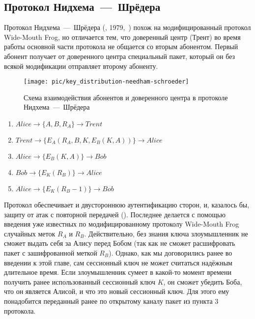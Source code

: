 \subsection{Протокол Нидхема~---~Шрёдера}\label{section-protocols-needham-schroeder}

Протокол Нидхема~---~Шрёдера (, 1979,~\cite{Needham:Schroeder:1978}) похож на модифицированный протокол Wide-Mouth Frog, но отличается тем, что доверенный центр (Трент) во время работы основной части протокола не общается со вторым абонентом. Первый абонент получает от доверенного центра специальный пакет, который он без всякой модификации отправляет второму абоненту.

\begin{figure}[!htb]
    \centering
    \texttt{[image: pic/key\_distribution-needham-schroeder]}
    \caption{Схема взаимодействия абонентов и доверенного центра в протоколе Нидхема~---~Шрёдера\label{fig:key_distribution-needham-schroeder}}
\end{figure}

\begin{enumerate}
	\item $ Alice	\rightarrow \{ A, B, R_A \}						\rightarrow Trent $
	\item $ Trent	\rightarrow \{ E_A \left( R_A, B, K, E_B \left( K, A \right) \right) \}	\rightarrow Alice $
	\item $ Alice	\rightarrow \{ E_B \left( K, A \right) \}				\rightarrow Bob $
	\item $ Bob	\rightarrow \{ E_K \left( R_B \right) \}				\rightarrow Alice $
	\item $ Alice	\rightarrow \{ E_K \left( R_B - 1 \right) \}				\rightarrow Bob $
\end{enumerate}

Протокол обеспечивает и двустороннюю аутентификацию сторон, и, казалось бы, защиту от атак с повторной передачей (). Последнее делается с помощью введения уже известных по модифицированному протоколу Wide-Mouth Frog случайных меток $R_A$ и $R_B$. Действительно, без знания ключа злоумышленник не сможет выдать себя за Алису перед Бобом (так как не сможет расшифровать пакет с зашифрованной меткой $R_B$). Однако, как мы договорились ранее во введении к этой главе, сам сессионный ключ не может считаться надёжным длительное время. Если злоумышленник сумеет в какой-то момент времени получить ранее использованный сессионный ключ $K$, он сможет убедить Боба, что он является Алисой, и что это новый сессионный ключ. Для этого ему понадобится переданный ранее по открытому каналу пакет из пункта 3 протокола.

